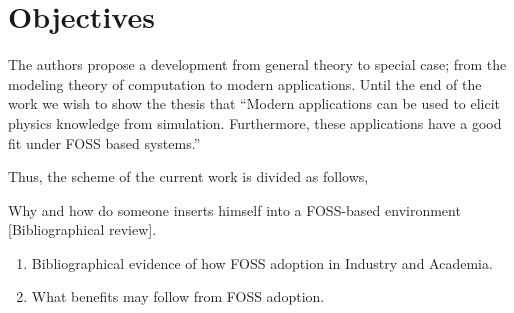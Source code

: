 \documentclass[
12pt,				%
openright,			%
oneside,			%
a4paper,			%
brazil,				%
english,			%
]{abntex2}
\begin{document}
\section{Objectives}


The authors propose a development from general theory to special case;
from the modeling theory of computation to modern applications. Until the
end of the work we wish to show the thesis that ``Modern applications
can be used to elicit physics knowledge from simulation. Furthermore,
these applications have a good fit under FOSS based systems.''

Thus, the scheme of the current work is divided as follows,


\item Why and how do someone inserts himself into a FOSS-based environment [Bibliographical review].
\begin{enumerate}
\item Bibliographical evidence of how FOSS adoption in Industry and Academia. 
\item What benefits may follow from FOSS adoption.
\end{enumerate}
\end{document}
